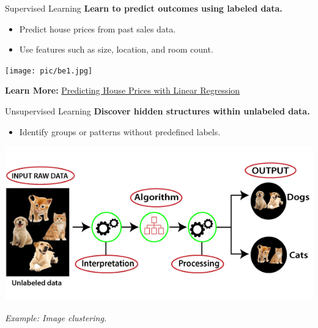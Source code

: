 \documentclass[serif, aspectratio=169]{beamer}
\begin{document}
    \begin{frame}{Supervised Learning}
        \textbf{Learn to predict outcomes using labeled data.}

        \begin{itemize}
            \item Predict house prices from past sales data.
            \item Use features such as size, location, and room count.
        \end{itemize}


        \begin{center}
            \centering
            \texttt{[image: pic/be1.jpg]}
        \end{center}

        \textbf{Learn More:}
        \href{https://towardsdatascience.com/predicting-house-prices-with-linear-regression-machine-learning-from-scratch-part-ii-47a0238aeac1}{Predicting House Prices with Linear Regression}
    \end{frame}

    \begin{frame}{Unsupervised Learning}
        \textbf{Discover hidden structures within unlabeled data.}

        \begin{itemize}
            \item Identify groups or patterns without predefined labels.
        \end{itemize}

        \begin{center}
            \includegraphics[width=0.7\linewidth]{pic/be2.png}
        \end{center}

        \begin{center}
            \textit{Example: Image clustering.}
        \end{center}
    \end{frame}
\end{document}
